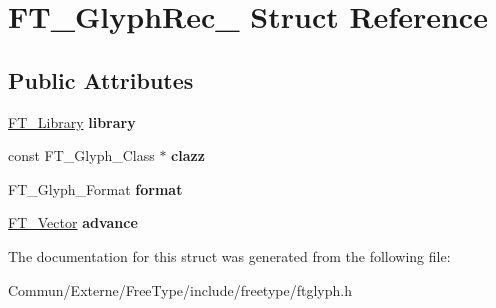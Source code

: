 \hypertarget{struct_f_t___glyph_rec__}{}\section{F\+T\+\_\+\+Glyph\+Rec\+\_\+ Struct Reference}
\label{struct_f_t___glyph_rec__}
\subsection*{Public Attributes}
\begin{DoxyCompactItemize}
\item 
\hyperlink{struct_f_t___library_rec__}{F\+T\+\_\+\+Library} {\bfseries library}\hypertarget{struct_f_t___glyph_rec___a00679b5e2519affab0f3999718817f8e}{}\label{struct_f_t___glyph_rec___a00679b5e2519affab0f3999718817f8e}

\item 
const F\+T\+\_\+\+Glyph\+\_\+\+Class $\ast$ {\bfseries clazz}\hypertarget{struct_f_t___glyph_rec___ad7074cfe0e9fd6616e4dc4011e481524}{}\label{struct_f_t___glyph_rec___ad7074cfe0e9fd6616e4dc4011e481524}

\item 
F\+T\+\_\+\+Glyph\+\_\+\+Format {\bfseries format}\hypertarget{struct_f_t___glyph_rec___a26b42a2610a69dcaed3e7c8b6d506211}{}\label{struct_f_t___glyph_rec___a26b42a2610a69dcaed3e7c8b6d506211}

\item 
\hyperlink{struct_f_t___vector__}{F\+T\+\_\+\+Vector} {\bfseries advance}\hypertarget{struct_f_t___glyph_rec___afd95b047df6a249db79018a279137018}{}\label{struct_f_t___glyph_rec___afd95b047df6a249db79018a279137018}

\end{DoxyCompactItemize}


The documentation for this struct was generated from the following file\+:\begin{DoxyCompactItemize}
\item 
Commun/\+Externe/\+Free\+Type/include/freetype/ftglyph.\+h\end{DoxyCompactItemize}

